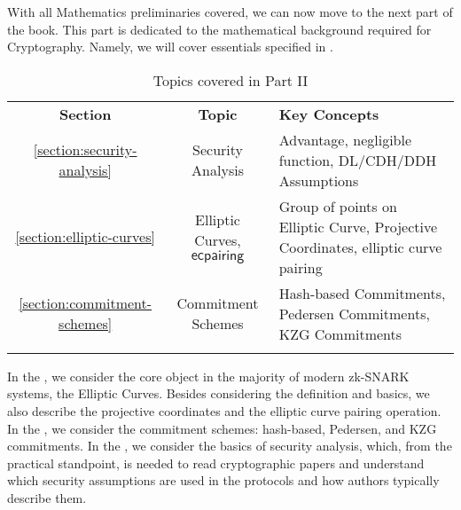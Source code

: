 \documentclass[../../lecture-notes-148x210.tex]{subfiles}
\begin{document}
With all Mathematics preliminaries covered, we can now move to the next part of
the book. This part is dedicated to the mathematical background required for
Cryptography. Namely, we will cover essentials specified in .

\begin{table}[H]
    \centering
    \begin{tabularx}{\textwidth}{ccX}
        \Xhline{3\arrayrulewidth}
        \rowcolor{green!30}\textbf{Section} & \textbf{Topic} & \textbf{Key Concepts} \\
        \Xhline{3\arrayrulewidth}
        \rowcolor{green!10}\ref{section:security-analysis} & Security Analysis & Advantage, negligible function, DL/CDH/DDH Assumptions \\
        \hdashline
        \rowcolor{green!10}\ref{section:elliptic-curves} & Elliptic Curves, $\mathsf{ecpairing}$ & Group of points on Elliptic Curve, Projective Coordinates, elliptic curve pairing \\
        \hdashline
        \rowcolor{green!20}\ref{section:commitment-schemes} & Commitment Schemes &
        Hash-based Commitments, Pedersen Commitments, KZG Commitments \\
        \Xhline{3\arrayrulewidth}
    \end{tabularx}
    \caption{Topics covered in Part II}
    \label{tab:essentialls-2}
\end{table}

In the , we consider the core object in the
majority of modern zk-SNARK systems, the Elliptic Curves. Besides considering
the definition and basics, we also describe the projective coordinates and the
elliptic curve pairing operation. In the , we
consider the commitment schemes: hash-based, Pedersen, and KZG commitments. In
the , we consider the basics of security
analysis, which, from the practical standpoint, is needed to read 
cryptographic papers and understand which security assumptions are used in the
protocols and how authors typically describe them.
\end{document}
